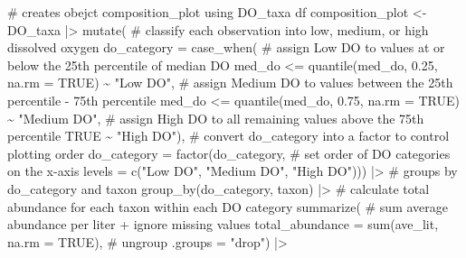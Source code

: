 \documentclass[
  letterpaper,
  DIV=11,
  numbers=noendperiod]{scrartcl}
\newenvironment{Shaded}{\begin{snugshade}}{\end{snugshade}}
\newcommand{\AttributeTok}[1]{\textcolor[rgb]{0.40,0.45,0.13}{#1}}
\newcommand{\CommentTok}[1]{\textcolor[rgb]{0.37,0.37,0.37}{#1}}
\newcommand{\ConstantTok}[1]{\textcolor[rgb]{0.56,0.35,0.01}{#1}}
\newcommand{\FloatTok}[1]{\textcolor[rgb]{0.68,0.00,0.00}{#1}}
\newcommand{\FunctionTok}[1]{\textcolor[rgb]{0.28,0.35,0.67}{#1}}
\newcommand{\NormalTok}[1]{\textcolor[rgb]{0.00,0.23,0.31}{#1}}
\newcommand{\OtherTok}[1]{\textcolor[rgb]{0.00,0.23,0.31}{#1}}
\newcommand{\SpecialCharTok}[1]{\textcolor[rgb]{0.37,0.37,0.37}{#1}}
\newcommand{\StringTok}[1]{\textcolor[rgb]{0.13,0.47,0.30}{#1}}
\begin{document}
\begin{Shaded}
\begin{Highlighting}[]
\CommentTok{\# creates obejct composition\_plot using DO\_taxa df}
\NormalTok{composition\_plot }\OtherTok{\textless{}{-}}\NormalTok{ DO\_taxa }\SpecialCharTok{|\textgreater{}} 
  \FunctionTok{mutate}\NormalTok{(}
    \CommentTok{\# classify each observation into low, medium, or high dissolved oxygen}
    \AttributeTok{do\_category =} \FunctionTok{case\_when}\NormalTok{(}
      \CommentTok{\# assign Low DO to values at or below the 25th percentile of median DO}
\NormalTok{      med\_do }\SpecialCharTok{\textless{}=} \FunctionTok{quantile}\NormalTok{(med\_do, }\FloatTok{0.25}\NormalTok{, }\AttributeTok{na.rm =} \ConstantTok{TRUE}\NormalTok{) }\SpecialCharTok{\textasciitilde{}} \StringTok{"Low DO"}\NormalTok{,}
      \CommentTok{\# assign Medium DO to values between the 25th percentile {-} 75th percentile}
\NormalTok{      med\_do }\SpecialCharTok{\textless{}=} \FunctionTok{quantile}\NormalTok{(med\_do, }\FloatTok{0.75}\NormalTok{, }\AttributeTok{na.rm =} \ConstantTok{TRUE}\NormalTok{) }\SpecialCharTok{\textasciitilde{}} \StringTok{"Medium DO"}\NormalTok{,}
      \CommentTok{\# assign High DO to all remaining values above the 75th percentile}
      \ConstantTok{TRUE} \SpecialCharTok{\textasciitilde{}} \StringTok{"High DO"}\NormalTok{),}
    \CommentTok{\# convert do\_category into a factor to control plotting order}
    \AttributeTok{do\_category =} \FunctionTok{factor}\NormalTok{(do\_category,}
                         \CommentTok{\# set order of DO categories on the x{-}axis}
                         \AttributeTok{levels =} \FunctionTok{c}\NormalTok{(}\StringTok{"Low DO"}\NormalTok{, }\StringTok{"Medium DO"}\NormalTok{, }\StringTok{"High DO"}\NormalTok{))) }\SpecialCharTok{|\textgreater{}}
  \CommentTok{\# groups by do\_category and taxon}
  \FunctionTok{group\_by}\NormalTok{(do\_category, taxon) }\SpecialCharTok{|\textgreater{}}
  \CommentTok{\# calculate total abundance for each taxon within each DO category}
  \FunctionTok{summarize}\NormalTok{(}
    \CommentTok{\# sum average abundance per liter + ignore missing values}
    \AttributeTok{total\_abundance =} \FunctionTok{sum}\NormalTok{(ave\_lit, }\AttributeTok{na.rm =} \ConstantTok{TRUE}\NormalTok{),}
    \CommentTok{\# ungroup}
    \AttributeTok{.groups =} \StringTok{"drop"}\NormalTok{) }\SpecialCharTok{|\textgreater{}}


\end{Highlighting}
\end{Shaded}
\end{document}
